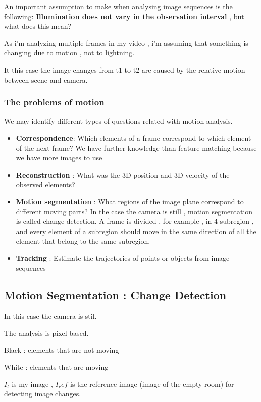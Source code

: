 \documentclass{article}
\begin{document}
An important assumption to make when analysing image sequences is the following: \textbf{Illumination does not vary in the observation interval} , but what does this mean? 

As i'm analyzing multiple frames in my video , i'm assuming that something is changing due to motion , not to lightning.

It this case the image changes from t1 to t2 are caused by the relative motion between scene and camera.

\subsubsection{The problems of motion}

We may identify different types of questions related with motion analysis.

\begin{itemize}
    \item \textbf{Correspondence}: Which elements of a frame correspond to which element of the next frame? We have further knowledge than feature matching because we have more images to use
    \item \textbf{Reconstruction} : What was the 3D position and 3D velocity of the observed elements?
    \item \textbf{Motion segmentation} : What regions of the image plane correspond to different moving parts? In the case the camera is still , motion segmentation is called change detection. A frame is divided , for example , in 4 subregion , and every element of a subregion should move in the same direction of all the element that belong to the same subregion.
    \item \textbf{Tracking} : Estimate the trajectories of points or objects from image sequences
\end{itemize}

\vspace{70mm}

\subsection{Motion Segmentation : Change Detection}

In this case the camera is stil.

The analysis is pixel based.

Black : elements that are not moving

White : elements that are moving

$I_t$ is my image , $I_ref$ is the reference image (image of the empty room) for detecting image changes.
\end{document}
